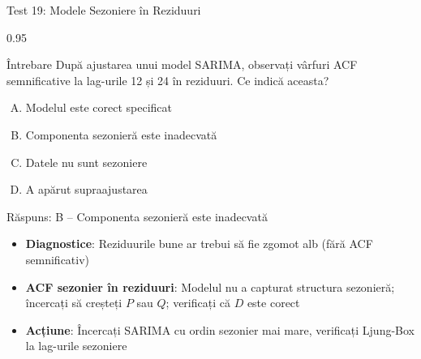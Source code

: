 \documentclass[9pt, aspectratio=169, t]{beamer}
\begin{document}
\begin{frame}{Test 19: Modele Sezoniere în Reziduuri}
    \begin{cminipage}{0.95\textwidth}
    \begin{alertblock}{Întrebare}
        După ajustarea unui model SARIMA, observați vârfuri ACF semnificative la lag-urile 12 și 24 în reziduuri. Ce indică aceasta?
    \end{alertblock}

    \vspace{0.15cm}

    \begin{enumerate}[A)]\setlength{\itemsep}{0pt}
        \item Modelul este corect specificat
        \item Componenta sezonieră este inadecvată
        \item Datele nu sunt sezoniere
        \item A apărut supraajustarea
    \end{enumerate}

    \vspace{0.2cm}
    \pause
    \begin{exampleblock}{Răspuns: B -- Componenta sezonieră este inadecvată}
        {\footnotesize
        \begin{itemize}\setlength{\itemsep}{0pt}
        \item \textbf{Diagnostice}: Reziduurile bune ar trebui să fie zgomot alb (fără ACF semnificativ)
        \item \textbf{ACF sezonier în reziduuri}: Modelul nu a capturat structura sezonieră; încercați să creșteți $P$ sau $Q$; verificați că $D$ este corect
        \item \textbf{Acțiune}: Încercați SARIMA cu ordin sezonier mai mare, verificați Ljung-Box la lag-urile sezoniere
        \end{itemize}
        }
    \end{exampleblock}
    \end{cminipage}
\end{frame}
\end{document}
